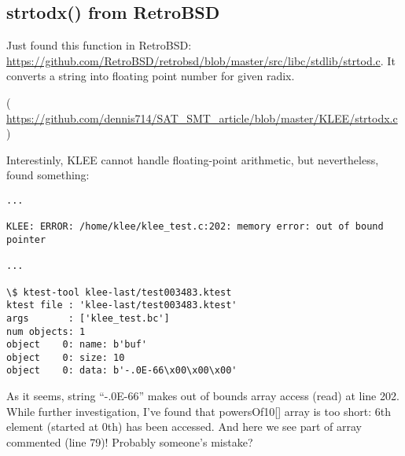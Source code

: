 \subsection{strtodx() from RetroBSD}

Just found this function in RetroBSD:
\url{https://github.com/RetroBSD/retrobsd/blob/master/src/libc/stdlib/strtod.c}.
It converts a string into floating point number for given radix.


( \url{https://github.com/dennis714/SAT_SMT_article/blob/master/KLEE/strtodx.c} )

Interestinly, KLEE cannot handle floating-point arithmetic, but nevertheless, found something:

\begin{lstlisting}
...

KLEE: ERROR: /home/klee/klee_test.c:202: memory error: out of bound pointer

...

\$ ktest-tool klee-last/test003483.ktest
ktest file : 'klee-last/test003483.ktest'
args       : ['klee_test.bc']
num objects: 1
object    0: name: b'buf'
object    0: size: 10
object    0: data: b'-.0E-66\x00\x00\x00'
\end{lstlisting}

As it seems, string ``-.0E-66'' makes out of bounds array access (read) at line 202.
While further investigation, I've found that powersOf10[] array is too short: 6th element (started at 0th) has been accessed.
And here we see part of array commented (line 79)!
Probably someone's mistake?



